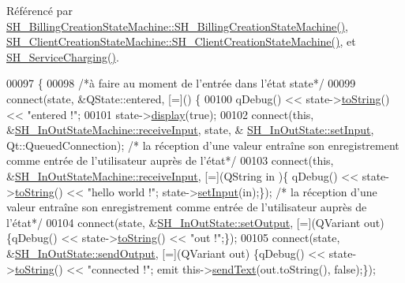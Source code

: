 Référencé par \hyperlink{classSH__BillingCreationStateMachine_ad62b77fa4aeafe200056ff3974562f83}{S\-H\-\_\-\-Billing\-Creation\-State\-Machine\-::\-S\-H\-\_\-\-Billing\-Creation\-State\-Machine()}, \hyperlink{classSH__ClientCreationStateMachine_a0b406b0f404c0fd33bf35be8ce0cc811}{S\-H\-\_\-\-Client\-Creation\-State\-Machine\-::\-S\-H\-\_\-\-Client\-Creation\-State\-Machine()}, et \hyperlink{classSH__ServiceCharging_afa5273d046049b1c2b020a6a19a8290b}{S\-H\-\_\-\-Service\-Charging()}.


\begin{DoxyCode}
00097 \{
00098     \textcolor{comment}{/*à faire au moment de l'entrée dans l'état state*/}
00099     connect(state, &QState::entered, [=]() \{
00100         qDebug() << state->\hyperlink{classSH__GenericState_a7779babbb40f3f8faa71112204d9804f}{toString}() << \textcolor{stringliteral}{"entered !"};
00101         state->\hyperlink{classSH__InOutState_a616f88b20478b81b2927a9ddc2b4f521}{display}(\textcolor{keyword}{true});
00102         connect(\textcolor{keyword}{this}, &\hyperlink{classSH__InOutStateMachine_a037ed5e13ecfae2123a8d4940292e410}{SH\_InOutStateMachine::receiveInput}, state, &
      \hyperlink{classSH__InOutState_aaec9c2b5ef7c406bff7469461352d47c}{SH\_InOutState::setInput}, Qt::QueuedConnection); \textcolor{comment}{/* la réception d'une valeur
       entraîne son enregistrement comme entrée de l'utilisateur auprès de l'état*/}
00103         connect(\textcolor{keyword}{this}, &\hyperlink{classSH__InOutStateMachine_a037ed5e13ecfae2123a8d4940292e410}{SH\_InOutStateMachine::receiveInput}, [=](QString in
      )\{ qDebug() << state->\hyperlink{classSH__GenericState_a7779babbb40f3f8faa71112204d9804f}{toString}() << \textcolor{stringliteral}{"hello world !"}; state->\hyperlink{classSH__InOutState_aaec9c2b5ef7c406bff7469461352d47c}{setInput}(in);\}); \textcolor{comment}{/* la réception
       d'une valeur entraîne son enregistrement comme entrée de l'utilisateur auprès de l'état*/}
00104         connect(state, &\hyperlink{classSH__InOutState_af611c84134e262739cd834797b315c80}{SH\_InOutState::setOutput}, [=](QVariant out) \{qDebug() << 
      state->\hyperlink{classSH__GenericState_a7779babbb40f3f8faa71112204d9804f}{toString}() << \textcolor{stringliteral}{"out !"};\});
00105         connect(state, &\hyperlink{classSH__InOutState_a77921c5f42059bc97361f4ff7827da12}{SH\_InOutState::sendOutput}, [=](QVariant out) \{qDebug() << 
      state->\hyperlink{classSH__GenericState_a7779babbb40f3f8faa71112204d9804f}{toString}() << \textcolor{stringliteral}{"connected !"}; emit this->\hyperlink{classSH__InOutStateMachine_a5e7f5958bae31696b6a8deab94ad2b4f}{sendText}(out.toString(), \textcolor{keyword}{false});\});

\end{DoxyCode}
